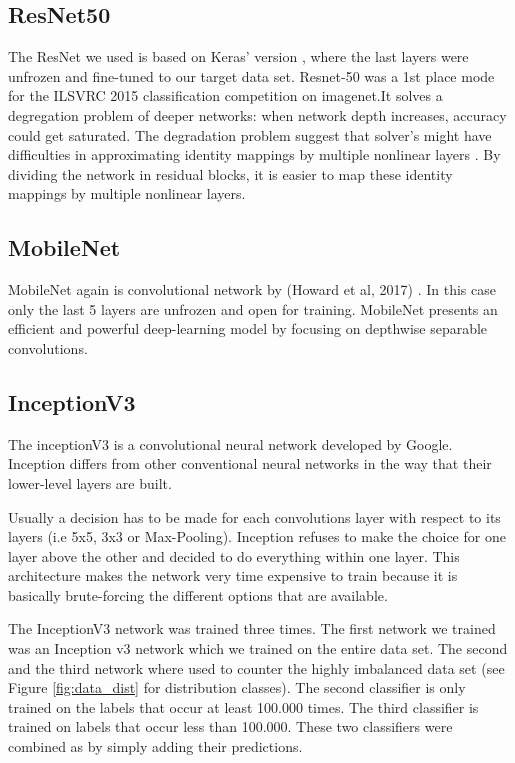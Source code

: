 \documentclass[10pt, a4paper]{article}
\begin{document}
\begin{multicols}{2}
		
		\subsection{ResNet50}
		The ResNet we used is based on Keras' version \cite{DBLP:journals/corr/HeZRS15}, where the last layers were unfrozen and fine-tuned to our target data set. Resnet-50 was a 
		1st place mode for the ILSVRC 2015 classification competition on imagenet.It solves a degregation problem of deeper networks: when network depth increases, accuracy could get saturated. The degradation problem suggest that solver's might have difficulties in approximating identity mappings by multiple nonlinear layers \cite{he2016deep}.
		By dividing the network in residual blocks, it is easier to map these identity mappings by multiple nonlinear layers.
		
		\subsection{MobileNet}
		MobileNet again is convolutional network by (Howard et al, 2017) \cite{howard2017mobilenets}. In this case only the last 5 layers are unfrozen and open for training. MobileNet presents an efficient and powerful deep-learning model by focusing on depthwise separable convolutions. 
		
		\subsection{InceptionV3}
		The inceptionV3 \cite{DBLP:journals/corr/SzegedyVISW15} is a convolutional neural network developed by Google. Inception differs from other conventional neural networks in the way that their lower-level layers are built.
		
		Usually a decision has to be made for each convolutions layer with respect to its layers (i.e 5x5, 3x3 or Max-Pooling). Inception refuses to make the choice for one layer above the other and decided to do everything within one layer. This architecture makes the network very time expensive to train because it is basically brute-forcing the different options that are available.
		
		The InceptionV3 network was trained three times. The first network we trained was an Inception v3 network which we trained on the entire data set. The second and the third network where used to counter the highly imbalanced data set (see Figure \ref{fig:data_dist} for distribution classes). The second classifier is only trained on the labels that occur at least 100.000 times. The third classifier is trained on labels that occur less than 100.000. These two classifiers were combined as by simply adding their predictions. 


\end{multicols}
\end{document}
